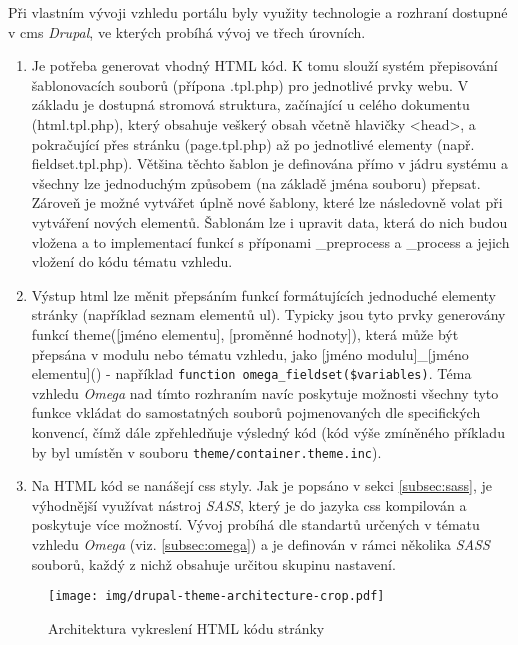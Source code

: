 Při vlastním vývoji vzhledu portálu byly využity technologie a rozhraní dostupné v \gls{cms} \emph{Drupal}, ve kterých probíhá vývoj ve třech úrovních.

\begin{enumerate}
  \item Je potřeba generovat vhodný HTML kód. K tomu slouží systém přepisování šablonovacích souborů (přípona .tpl.php) pro jednotlivé prvky webu. V základu je dostupná stromová struktura, začínající u celého dokumentu (html.tpl.php), který obsahuje veškerý obsah včetně hlavičky <head>, a pokračující přes stránku (page.tpl.php) až po jednotlivé elementy (např. fieldset.tpl.php). Většina těchto šablon je definována přímo v jádru systému a všechny lze jednoduchým způsobem (na základě jména souboru) přepsat. Zároveň je možné vytvářet úplně nové šablony, které lze následovně volat při vytváření nových elementů. Šablonám lze i upravit data, která do nich budou vložena a to implementací funkcí s příponami \_preprocess a \_process a jejich vložení do kódu tématu vzhledu. 
  
  \item Výstup html lze měnit přepsáním funkcí formátujících jednoduché elementy stránky (například seznam elementů ul). Typicky jsou tyto prvky generovány funkcí theme([jméno elementu], [proměnné hodnoty]), která může být přepsána v modulu nebo tématu vzhledu, jako [jméno modulu]\_[jméno elementu]() - například \texttt{function omega\_fieldset(\$variables)}. Téma vzhledu \emph{Omega} nad tímto rozhraním navíc poskytuje možnosti všechny tyto funkce vkládat do samostatných souborů pojmenovaných dle specifických konvencí, čímž dále zpřehledňuje výsledný kód (kód výše zmíněného příkladu by byl umístěn v souboru \texttt{theme/container.theme.inc}).
  \item Na HTML kód se nanášejí \gls{css} styly. Jak je popsáno v sekci \ref{subsec:sass}, je výhodnější využívat nástroj \emph{SASS}, který je do jazyka \gls{css} kompilován a poskytuje více možností. Vývoj probíhá dle standartů určených v tématu vzhledu \emph{Omega} (viz. \ref{subsec:omega}) a je definován v rámci několika \emph{SASS} souborů, každý z nichž obsahuje určitou skupinu nastavení.
\end{enumerate}

\begin{figure}[]
  \texttt{[image: img/drupal-theme-architecture-crop.pdf]}
  \caption{Architektura vykreslení HTML kódu stránky}
  \label{fig:theme_architecture}
\end{figure}  

